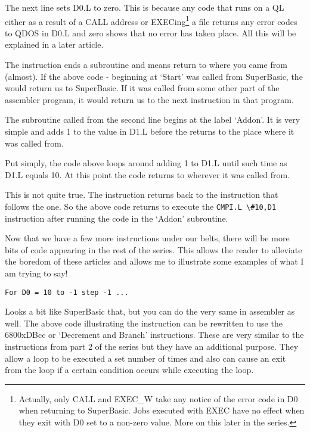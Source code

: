 The next line sets D0.L to zero. This is because any code that runs
    on a QL either as a result of a CALL address or EXECing\footnote{Actually, only CALL and EXEC\_W take any notice of the error code in D0 when returning to SuperBasic. Jobs executed with EXEC have no effect when they exit with D0 set to a non-zero value. More on this later in the series.} a file returns any
    error codes to QDOS in D0.L and zero shows that no error has taken place.
    All this will be explained in a later article.

The  instruction ends a subroutine and means return to where you
    came from (almost). If the above code -{} beginning at `Start' was called
    from SuperBasic, the  would return us to SuperBasic. If it was called
    from some other part of the assembler program, it would return us to the
    next instruction in that program.

The subroutine called from the second line begins at the label
    `Addon'. It is very simple and adds 1 to the value in D1.L before the 
    returns to the place where it was called from.

Put simply, the code above loops around adding 1 to D1.L until such
    time as D1.L equals 10. At this point the code returns to wherever it was
    called from.

This is not quite true. The  instruction returns back to the
    instruction that follows the  one. So the above code returns to execute
    the \lstinline{CMPI.L \#10,D1} instruction after running the code in the `Addon'
    subroutine.

Now that we have a few more instructions under our belts, there will
    be more bits of code appearing in the rest of the series. This allows the
    reader to alleviate the boredom of these articles and allows me to
    illustrate some examples of what I am trying to say!

\begin{lstlisting}[firstnumber=1,]
For D0 = 10 to -1 step -1 ...
\end{lstlisting}

Looks a bit like SuperBasic that, but you can do the very same in
    assembler as well. The above code illustrating the  instruction can be
    rewritten to use the \mc6800x{DBcc} or `Decrement and Branch' instructions. These
    are very similar to the  instructions from part 2 of the series but
    they have an additional purpose. They allow a loop to be executed a set
    number of times and also can cause an exit from the loop if a certain
    condition occurs while executing the loop.

